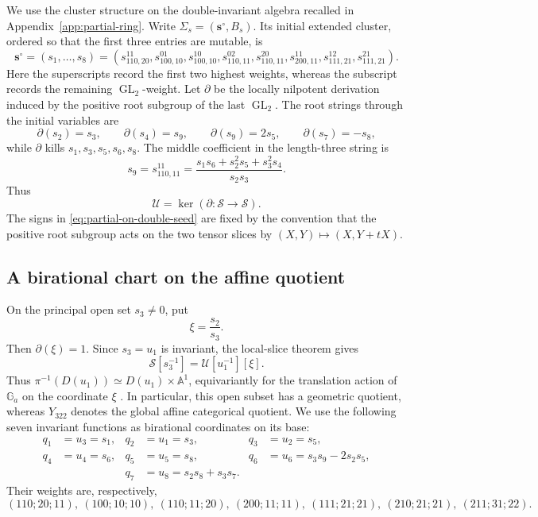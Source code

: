 \documentclass[11pt,reqno]{amsart}
\numberwithin{equation}{section}
\theoremstyle{remark}
\newcommand{\SR}{\mathscr S}
\newcommand{\UR}{\mathscr U}
\newcommand{\GL}{\operatorname{GL}}
\begin{document}
We use the cluster structure on the double-invariant algebra recalled in
Appendix~\ref{app:partial-ring}.  Write
$\Sigma_s=(\mathbf s^\circ,B_s)$.  Its initial extended cluster, ordered so
that the first three entries are mutable, is
\begin{equation}
\label{eq:double-initial-cluster}
 \mathbf s^\circ=(s_1,\ldots,s_8)
 =\left(
 s_{110,20}^{11},
 s_{100,10}^{01},
 s_{100,10}^{10},
 s_{110,11}^{02},
 s_{110,11}^{20},
 s_{200,11}^{11},
 s_{111,21}^{12},
 s_{111,21}^{21}
 \right).
\end{equation}
Here the superscripts record the first two highest weights, whereas the
subscript records the remaining $\GL_2$-weight.  Let $\partial$ be the locally nilpotent derivation induced by the positive root
subgroup of the last $\GL_2$.  The root strings through the initial
variables are
\begin{equation}
\label{eq:partial-on-double-seed}
 \partial(s_2)=s_3,
 \qquad
 \partial(s_4)=s_9,
 \qquad
 \partial(s_9)=2s_5,
 \qquad
 \partial(s_7)=-s_8,
\end{equation}
while $\partial$ kills $s_1,s_3,s_5,s_6,s_8$.  The middle coefficient in the
length-three string is
\begin{equation}
\label{eq:middle-root-coefficient}
 s_9=s_{110,11}^{11}
 =\frac{s_1s_6+s_2^2s_5+s_3^2s_4}{s_2s_3}.
\end{equation}
Thus
\[ \UR=\ker(\partial:\SR\longrightarrow\SR). \]
The signs in \eqref{eq:partial-on-double-seed} are fixed by the convention that the
positive root subgroup acts on the two tensor slices by
$(X,Y)\mapsto(X,Y+tX)$.

\subsection{A birational chart on the affine quotient}

On the principal open set $s_3\ne0$, put
\[ \xi=\frac{s_2}{s_3}. \]
Then $\partial(\xi)=1$.  Since $s_3=u_1$ is invariant, the local-slice
theorem gives
\[ \SR[s_3^{-1}]=\UR[u_1^{-1}][\xi]. \]
Thus $\pi^{-1}(D(u_1))\simeq D(u_1)\times\mathbb A^1$, equivariantly for
the translation action of $\mathbb G_a$ on the coordinate $\xi$
\cite[Chapter~1]{Freudenburg}.  In particular, this open subset has a
geometric quotient, whereas $Y_{322}$ denotes the global affine
categorical quotient.  We use the following seven invariant functions as
birational coordinates on its base:
\begin{equation}
\label{eq:quotient-coordinates}
 \begin{aligned}
 q_1&=u_3=s_1,&
 q_2&=u_1=s_3,&
 q_3&=u_2=s_5,\\
 q_4&=u_4=s_6,&
 q_5&=u_5=s_8,&
 q_6&=u_6=s_3s_9-2s_2s_5,\\
 &&q_7&=u_8=s_2s_8+s_3s_7.
 \end{aligned}
\end{equation}
Their weights are, respectively,
\[ (110;20;11),\ (100;10;10),\ (110;11;20),\ (200;11;11),\ (111;21;21),\ (210;21;21),\ (211;31;22). \]
\end{document}
